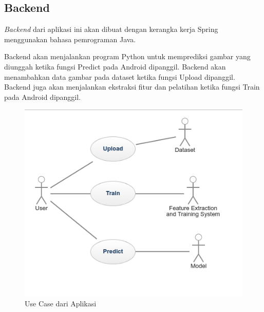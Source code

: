 \subsection{Backend}
\par \textit{Backend} dari aplikasi ini akan dibuat dengan kerangka kerja Spring menggunakan bahasa pemrograman Java.
\par Backend akan menjalankan program Python untuk memprediksi gambar yang diunggah ketika fungsi Predict pada Android dipanggil. Backend akan menambahkan data gambar pada dataset ketika fungsi Upload dipanggil. Backend juga akan menjalankan ekstraksi fitur dan pelatihan ketika fungsi Train pada Android dipanggil.
\begin{figure}[!ht]
	\centering\includegraphics[width=1.0\textwidth]{bab3/figures/usecase.png}
	\caption{Use Case dari Aplikasi}
	\label{fig:usecase}
\end{figure}
\begin{flushleft}
\end{flushleft}